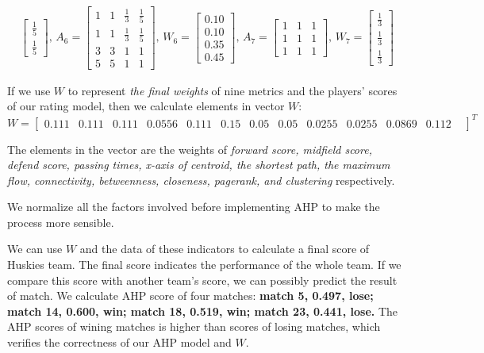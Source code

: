 \documentclass[12pt]{mcmthesis}
\begin{document}
\begin{equation}
\begin{aligned}
\begin{bmatrix}
		\frac{1}{5}\\
		\frac{1}{5}
		\end{bmatrix}
		\text{, }
			A_6 = \begin{bmatrix}
	1&	1&	\frac{1}{3}&	\frac{1}{5}\\
	1&	1&	\frac{1}{3}&	\frac{1}{5}\\
	3&	3&	1&	1\\
	5&	5&	1&	1
		\end{bmatrix}
		\text{, }
		W_6 = 
		\begin{bmatrix}
		0.10	\\0.10\\	0.35\\	0.45
		\end{bmatrix}
		\text{, }
		A_7 = \begin{bmatrix}
		1 & 1&1\\
		1&1&1\\
		1&1&1
		\end{bmatrix}
		\text{, }
		W_7 = 
		\begin{bmatrix}
		\frac{1}{3}\\\frac{1}{3}\\\frac{1}{3}
		\end{bmatrix}
	\end{aligned}
	\end{equation}
	
	If we use $W$ to represent \textit{the final weights} of nine metrics and the players' scores of our rating model, then we calculate elements in vector $W$:
	\setcounter{MaxMatrixCols}{20}
	\begin{equation}\nonumber
		W = 
		\begin{bmatrix}
		0.111&
		0.111&
		0.111&
		0.0556&
		0.111&
		0.15&
		0.05&
		0.05&
		0.0255&
		0.0255&
		0.0869&
		0.112&	
		\end{bmatrix}
		^T
	\end{equation}
	
	The elements in the vector are the weights of \textit{forward score, midfield score, defend score, passing times, x-axis of centroid, the shortest path, the maximum flow, connectivity, betweenness, closeness, pagerank, and clustering }respectively.
	
	We normalize all the factors involved before implementing AHP to make the process more sensible. 
	
	We can use $W$ and the data of these indicators to calculate a final score of Huskies team. The final score indicates the performance of the whole team. If we compare this score with another team's score, we can possibly predict the result of match. We calculate AHP score of four matches: 
	\textbf{match 5, 0.497, lose; match 14, 0.600, win; match 18, 0.519, win; match 23, 0.441, lose.} The AHP scores of wining matches is higher than scores of losing matches, which verifies the correctness of our AHP model and $W$.
	
\end{document}
